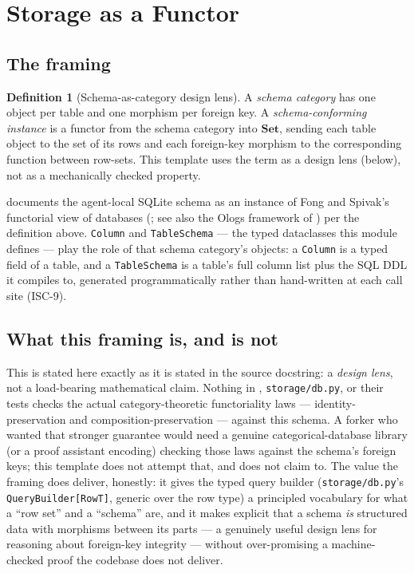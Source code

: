 \documentclass[
  english,
]{article}
\theoremstyle{definition}
\newtheorem{definition}[theorem]{Definition}
\begin{document}
\newpage

\section{Storage as a Functor}\label{sec:storage-functor}

\subsection{The framing}\label{the-framing}

\begin{definition}[Schema-as-category design lens]
A \emph{schema category} has one object per table and one morphism per foreign key. A
\emph{schema-conforming instance} is a functor from the schema category into \(\mathbf{Set}\),
sending each table object to the set of its rows and each foreign-key morphism to the corresponding
function between row-sets. This template uses the term as a design lens (below), not as a
mechanically checked property.
\end{definition}

 documents the
agent-local SQLite schema as an instance of Fong and Spivak's functorial
view of databases (\citet{fong2018seven}; see also the Ologs framework
of \citet{spivak2012ologs}) per the definition above. \texttt{Column}
and \texttt{TableSchema} --- the typed dataclasses this module defines
--- play the role of that schema category's objects: a \texttt{Column}
is a typed field of a table, and a \texttt{TableSchema} is a table's
full column list plus the SQL DDL it compiles to, generated
programmatically rather than hand-written at each call site (ISC-9).

\subsection{What this framing is, and is
not}\label{what-this-framing-is-and-is-not}

This is stated here exactly as it is stated in the source docstring: a
\emph{design lens}, not a load-bearing mathematical claim. Nothing in
, \texttt{storage/db.py}, or their tests
checks the actual category-theoretic functoriality laws ---
identity-preservation and composition-preservation --- against this
schema. A forker who wanted that stronger guarantee would need a genuine
categorical-database library (or a proof assistant encoding) checking
those laws against the schema's foreign keys; this template does not
attempt that, and does not claim to. The value the framing does deliver,
honestly: it gives the typed query builder (\texttt{storage/db.py}'s
\texttt{QueryBuilder{[}RowT{]}}, generic over the row type) a principled
vocabulary for what a ``row set'' and a ``schema'' are, and it makes
explicit that a schema \emph{is} structured data with morphisms between
its parts --- a genuinely useful design lens for reasoning about
foreign-key integrity --- without over-promising a machine-checked proof
the codebase does not deliver.
\end{document}
